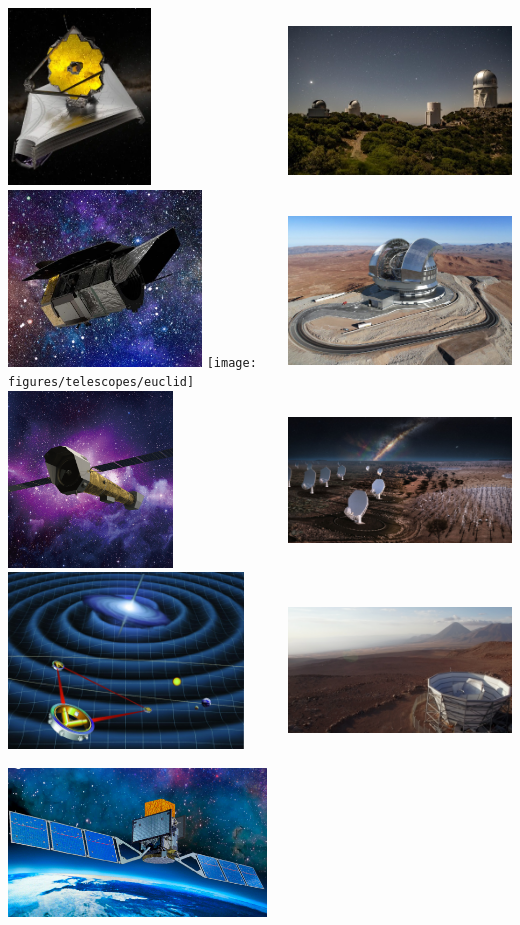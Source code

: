 \documentclass[aspectratio=169]{beamer}
\begin{document}
\begin{frame}
\begin{columns}
        \includegraphics[height=0.145\textwidth]{figures/telescopes/jwst}%
        \includegraphics[height=0.145\textwidth]{figures/telescopes/roman}%
        \texttt{[image: figures/telescopes/euclid]}%
        \includegraphics[height=0.145\textwidth]{figures/telescopes/athena}%
        \includegraphics[height=0.145\textwidth]{figures/telescopes/lisa}%
        \includegraphics[height=0.145\textwidth]{figures/telescopes/e-ASTROGAM}%
        \vspace{-1pt}

        \includegraphics[height=0.15183\textwidth]{figures/telescopes/desi}%
        \includegraphics[height=0.15183\textwidth]{figures/telescopes/eelt}%
        \includegraphics[height=0.15183\textwidth]{figures/telescopes/ska}%
        \includegraphics[height=0.15183\textwidth]{figures/telescopes/SO}%
        \vspace{-1pt}


\end{columns}
\end{frame}
\end{document}
